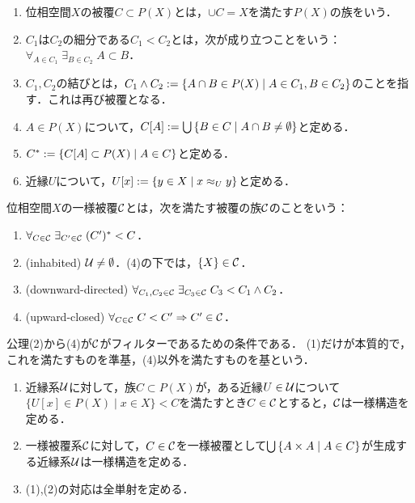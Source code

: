 \documentclass[uplatex,dvipdfmx]{jsreport}
\begin{document}
\begin{definition}[被覆]\mbox{}
    \begin{enumerate}
        \item 位相空間$X$の被覆$C\subset P(X)$とは，$\cup C=X$を満たす$P(X)$の族をいう．
        \item $C_1$は$C_2$の細分である$C_1<C_2$とは，次が成り立つことをいう：$\forall_{A\in C_1}\;\exists_{B\in C_2}\;A\subset B$．
        \item $C_1,C_2$の結びとは，$C_1\land C_2:=\left\{A\cap B\in P(X)\mid A\in C_1,B\in C_2\right\}$のことを指す．これは再び被覆となる．
        \item $A\in P(X)$について，$C[A]:=\bigcup\left\{B\in C\mid A\cap B\ne\emptyset\right\}$と定める．
        \item $C^*:=\left\{C[A]\subset P(X)\mid A\in C\right\}$と定める．
        \item 近縁$U$について，$U[x]:=\left\{y\in X\mid x\approx_U y\right\}$と定める．
    \end{enumerate}
\end{definition}

\begin{definition}
    位相空間$X$の一様被覆$\mathcal{C}$とは，次を満たす被覆の族$\mathcal{C}$のことをいう：
    \begin{enumerate}
        \item $\forall_{C\in\mathcal{C}}\;\exists_{C'\in\mathcal{C}}\;(C')^*<C$．
        \item (inhabited) $\mathcal{U}\ne\emptyset$．(4)の下では，$\{X\}\in\mathcal{C}$．
        \item (downward-directed) $\forall_{C_1,C_2\in\mathcal{C}}\;\exists_{C_3\in\mathcal{C}}\;C_3<C_1\land C_2$．
        \item (upward-closed) $\forall_{C\in\mathcal{C}}\;C<C'\Rightarrow C'\in\mathcal{C}$．
    \end{enumerate}
\end{definition}
\begin{remarks}
    公理(2)から(4)が$\mathcal{C}$がフィルターであるための条件である．
    (1)だけが本質的で，これを満たすものを準基，(4)以外を満たすものを基という．
\end{remarks}

\begin{lemma}[２つの定義の同値性]\mbox{}
    \begin{enumerate}
        \item 近縁系$\mathcal{U}$に対して，族$C\subset P(X)$が，ある近縁$U\in\mathcal{U}$について$\{U[x]\in P(X)\mid x\in X\}<C$を満たすとき$C\in\mathcal{C}$とすると，$\mathcal{C}$は一様構造を定める．
        \item 一様被覆系$\mathcal{C}$に対して，$C\in\mathcal{C}$を一様被覆として$\bigcup\left\{A\times A\mid A\in C\right\}$が生成する近縁系$\mathcal{U}$は一様構造を定める．
        \item (1),(2)の対応は全単射を定める．
    \end{enumerate}
\end{lemma}
\end{document}
